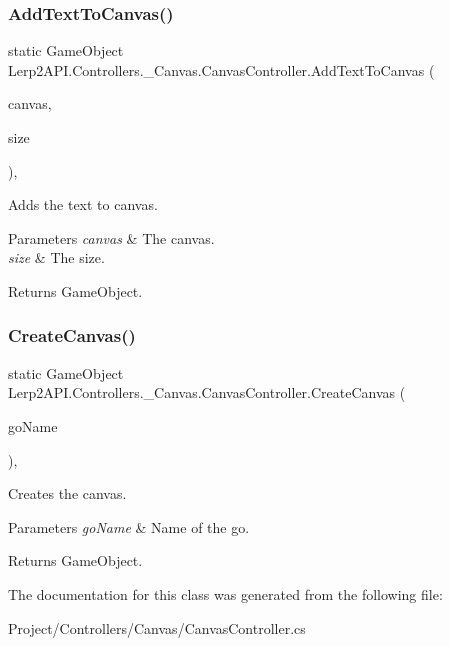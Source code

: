 \subsubsection{\texorpdfstring{Add\+Text\+To\+Canvas()}{AddTextToCanvas()}}
{\footnotesize\ttfamily static Game\+Object Lerp2\+A\+P\+I.\+Controllers.\+\_\+\+Canvas.\+Canvas\+Controller.\+Add\+Text\+To\+Canvas (\begin{DoxyParamCaption}\item[{Game\+Object}]{canvas,  }\item[{Vector2}]{size }\end{DoxyParamCaption})\hspace{0.3cm}{\ttfamily [inline]}, {\ttfamily [static]}}



Adds the text to canvas. 


\begin{DoxyParams}{Parameters}
{\em canvas} & The canvas.\\
\hline
{\em size} & The size.\\
\hline
\end{DoxyParams}
\begin{DoxyReturn}{Returns}
Game\+Object.
\end{DoxyReturn}
\mbox{\label{class_lerp2_a_p_i_1_1_controllers_1_1___canvas_1_1_canvas_controller_aaec67c623580d1b551b44126a89f97f3}} 
\subsubsection{\texorpdfstring{Create\+Canvas()}{CreateCanvas()}}
{\footnotesize\ttfamily static Game\+Object Lerp2\+A\+P\+I.\+Controllers.\+\_\+\+Canvas.\+Canvas\+Controller.\+Create\+Canvas (\begin{DoxyParamCaption}\item[{string}]{go\+Name }\end{DoxyParamCaption})\hspace{0.3cm}{\ttfamily [inline]}, {\ttfamily [static]}}



Creates the canvas. 


\begin{DoxyParams}{Parameters}
{\em go\+Name} & Name of the go.\\
\hline
\end{DoxyParams}
\begin{DoxyReturn}{Returns}
Game\+Object.
\end{DoxyReturn}


The documentation for this class was generated from the following file\+:\begin{DoxyCompactItemize}
\item 
Project/\+Controllers/\+Canvas/Canvas\+Controller.\+cs\end{DoxyCompactItemize}
